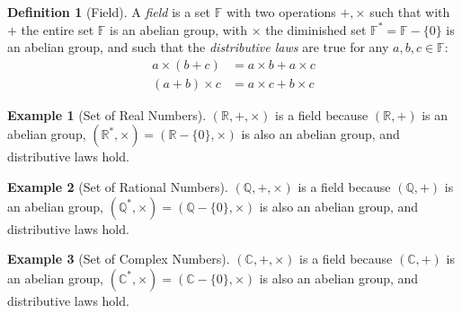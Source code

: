 \documentclass[english,notitlepage,smartquotes]{hgbreport}
\theoremstyle{definition}
\newtheorem{definition}{Definition}
\theoremstyle{definition}
\theoremstyle{remark}
\theoremstyle{definition}
\newtheorem{example}{Example}
\theoremstyle{plain}
\theoremstyle{definition}
\begin{document}
\begin{definition}[Field]
A \emph{field} is a set $\mathbb{F}$ with two operations $+,\times$ such that with $+$ the entire set $\mathbb{F}$ is an abelian group, with $\times$ the diminished set $\mathbb{F^*}=\mathbb{F}-\{0\}$ is an abelian group, and such that the \emph{distributive laws} are true for any $a,b,c\in\mathbb{F}$:
\begin{equation*}
\begin{aligned}
a\times(b+c)  &= a\times b+a\times c\\
(a+b)\times c &= a\times c+b\times c
\end{aligned}
\end{equation*}
\label{def:field}
\end{definition}

\begin{example}[Set of Real Numbers]
$(\mathbb{R},+,\times)$ is a field because $(\mathbb{R},+)$ is an abelian group, $(\mathbb{R^*},\times)=(\mathbb{R}-\{0\},\times)$ is also an abelian group, and distributive laws hold.
\end{example}

\begin{example}[Set of Rational Numbers]
$(\mathbb{Q},+,\times)$ is a field because $(\mathbb{Q},+)$ is an abelian group, $(\mathbb{Q^*},\times)=(\mathbb{Q}-\{0\},\times)$ is also an abelian group, and distributive laws hold.
\end{example}

\begin{example}[Set of Complex Numbers]
$(\mathbb{C},+,\times)$ is a field because $(\mathbb{C},+)$ is an abelian group, $(\mathbb{C^*},\times)=(\mathbb{C}-\{0\},\times)$ is also an abelian group, and distributive laws hold.
\end{example}
\end{document}
